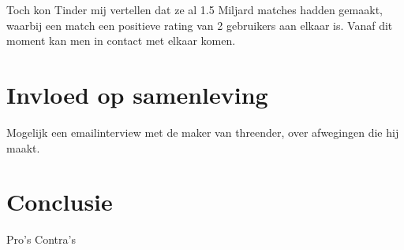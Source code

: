\documentclass[pdftex,12pt,a4paper]{article}
\begin{document}
Toch kon Tinder mij vertellen dat ze al 1.5 Miljard matches hadden gemaakt, waarbij een match een positieve rating van 2 gebruikers aan elkaar is. Vanaf dit moment kan men in contact met elkaar komen. 

\section{Invloed op samenleving}
Mogelijk een emailinterview met de maker van threender, over afwegingen die hij maakt.
\section{Conclusie}
Pro's
Contra's

\end{document}
